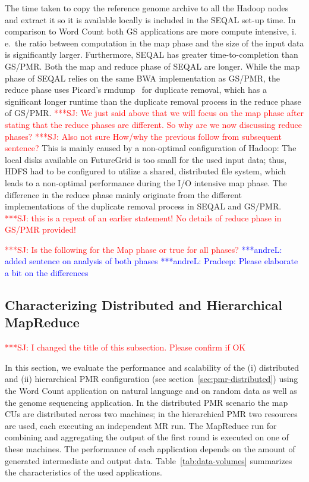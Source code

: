 \documentclass{acm_proc_article-sp}
\newcommand{\jhanote}[1]{ {\textcolor{red} { ***SJ: #1 }}}
\newcommand{\alnote}[1]{ {\textcolor{blue} { ***andreL: #1 }}}
\newcommand{\alnote}[1]{}
\newcommand{\jhanote}[1]{}
\newcommand{\upp}{\vspace*{-0.5em}}
\begin{document}
The time taken to copy the reference genome archive to all the Hadoop
nodes and extract it so it is available locally is included in the
SEQAL set-up time. In comparison to Word Count both GS applications
are more compute intensive, i.\,e.\ the ratio between computation in
the map phase and the size of the input data is significantly
larger. Furthermore, SEQAL has greater time-to-completion than
GS/PMR. Both the map and reduce phase of SEQAL are longer. While the
map phase of SEQAL relies on the same BWA implementation as GS/PMR,
the reduce phase uses Picard's rmdump~\cite{picard} for duplicate
removal, which has a significant longer runtime than the duplicate
removal process in the reduce phase of GS/PMR.  \jhanote{We just said
  above that we will focus on the map phase after stating that the
  reduce phases are different. So why are we now discussing reduce
  phases?}  \jhanote{Also not sure How/why the previous follow from
  subsequent sentence?}  This is mainly caused by a non-optimal
configuration of Hadoop: The local disks available on FutureGrid is
too small for the used input data; thus, HDFS had to be configured to
utilize a shared, distributed file system, which leads to a
non-optimal performance during the I/O intensive map phase. The
difference in the reduce phase mainly originate from the different
implementations of the duplicate removal process in SEQAL and
GS/PMR. \jhanote{this is a repeat of an earlier statement! No details
  of reduce phase in GS/PMR provided!}

\jhanote{Is the
  following for the Map phase or true for all phases?} \alnote{added
  sentence on analysis of both phases} 
\alnote{Pradeep: Please elaborate a bit on the differences}
\upp\upp

\subsection{Characterizing Distributed and Hierarchical MapReduce}

\jhanote{I changed the title of this subsection. Please confirm if OK}

In this section, we evaluate the performance and scalability of the
(i) distributed and (ii) hierarchical PMR configuration (see
section~\ref{sec:pmr-distributed}) using the Word Count application on
natural language and on random data as well as the genome sequencing
application. In the distributed PMR scenario the map CUs are
distributed across two machines; in the hierarchical PMR two
resources are used, each executing an independent MR run. The MapReduce
run for combining and aggregating the output of the first round is
executed on one of these machines. The performance of each application
depends on the amount of generated intermediate and output data.
Table~\ref{tab:data-volumes} summarizes the characteristics of the
used applications.
\end{document}
